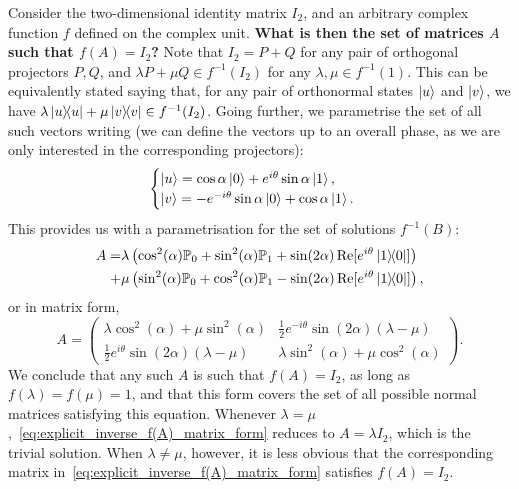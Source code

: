 \begin{example}[label={ex:solutions_f(A)=I2}]
Consider the two-dimensional identity matrix $I_2$, and an arbitrary complex function $f$ defined on the complex unit. \textbf{What is then the set of matrices $A$ such that $f(A)=I_2$?}
Note that $I_2=P+Q$ for any pair of orthogonal projectors $P,Q$, and $\lambda P + \mu Q\in f^{-1}(I_2)$ for any $\lambda,\mu\in f^{-1}(1)$.
This can be equivalently stated saying that, for any pair of orthonormal states $\ket u$ and $\ket v$, we have
$\lambda \ketbra u + \mu \ketbra v\in f^{-1}(I_2)$.
Going further, we parametrise the set of all such vectors writing (we can define the vectors up to an overall phase, as we are only interested in the corresponding projectors):
\begin{equation}
    \begin{cases}
    \ket u =\cos\alpha\ket 0+e^{i\theta}\sin\alpha \ket 1, \\
    \ket v =-e^{-i\theta}\sin\alpha\ket 0 + \cos\alpha\ket 1.
\end{cases}
\end{equation}
This provides us with a parametrisation for the set of solutions $f^{-1}(B)$:
\begin{equation}
\begin{aligned}
    A = &\lambda\left(\cos^2(\alpha) \mathbb{P}_0 + \sin^2(\alpha) \mathbb{P}_1 + \sin(2\alpha)\Re[e^{i\theta}\ketbra{1}{0}]\right) \\
    +&\mu\left(
        \sin^2(\alpha) \mathbb{P}_0 + \cos^2(\alpha) \mathbb{P}_1 - \sin(2\alpha)\Re[e^{i\theta}\ketbra{1}{0}]
    \right),
\end{aligned}
\end{equation}
or in matrix form,
\begin{equation}
    A = \begin{pmatrix}
        \lambda \cos^2(\alpha)+\mu\sin^2(\alpha) &
        \frac12 e^{-i\theta} \sin(2\alpha) (\lambda-\mu) \\ 
        \frac12 e^{i\theta} \sin(2\alpha) (\lambda-\mu) &
        \lambda \sin^2(\alpha)+\mu\cos^2(\alpha)
    \end{pmatrix}.
    \label{eq:explicit_inverse_f(A)_matrix_form}
\end{equation}
We conclude that any such $A$ is such that $f(A)=I_2$, as long as $f(\lambda)=f(\mu)=1$, and that this form covers the set of all possible normal matrices satisfying this equation.
Whenever $\lambda=\mu$,~\cref{eq:explicit_inverse_f(A)_matrix_form} reduces to $A=\lambda I_2$, which is the trivial solution. When $\lambda\neq\mu$, however, it is less obvious that the corresponding matrix in~\cref{eq:explicit_inverse_f(A)_matrix_form} satisfies $f(A)=I_2$.
\end{example}


